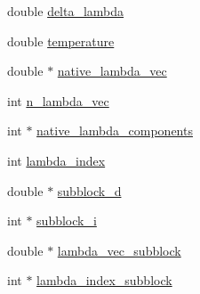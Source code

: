 \begin{DoxyCompactItemize}
double \hyperlink{structt__mde__delta__h__coll_aafc0da168977822dddd9ef5f031b3571}{delta\-\_\-lambda}
\item 
double \hyperlink{structt__mde__delta__h__coll_a668a4aaeea23b0bbbdd0d327a266839a}{temperature}
\item 
double $\ast$ \hyperlink{structt__mde__delta__h__coll_ab74952a20656734e6d8bc11226a45b58}{native\-\_\-lambda\-\_\-vec}
\item 
int \hyperlink{structt__mde__delta__h__coll_abda6f7ad867677fa673bdc3e5f674585}{n\-\_\-lambda\-\_\-vec}
\item 
int $\ast$ \hyperlink{structt__mde__delta__h__coll_a7e5e7ab606242cc4a2aa54e8546d449a}{native\-\_\-lambda\-\_\-components}
\item 
int \hyperlink{structt__mde__delta__h__coll_a986426f5b01a19e07fc37ccafdeecc8a}{lambda\-\_\-index}
\item 
double $\ast$ \hyperlink{structt__mde__delta__h__coll_ab26722c52478297b8ac8396d714b239c}{subblock\-\_\-d}
\item 
int $\ast$ \hyperlink{structt__mde__delta__h__coll_abdd1f208cbb796f7e34e0a806f1c9942}{subblock\-\_\-i}
\item 
double $\ast$ \hyperlink{structt__mde__delta__h__coll_af84e9940b4c13043859393e669682ff5}{lambda\-\_\-vec\-\_\-subblock}
\item 
int $\ast$ \hyperlink{structt__mde__delta__h__coll_ab482a3f7e1f918ee6127ec5101dda990}{lambda\-\_\-index\-\_\-subblock}
\end{DoxyCompactItemize}


